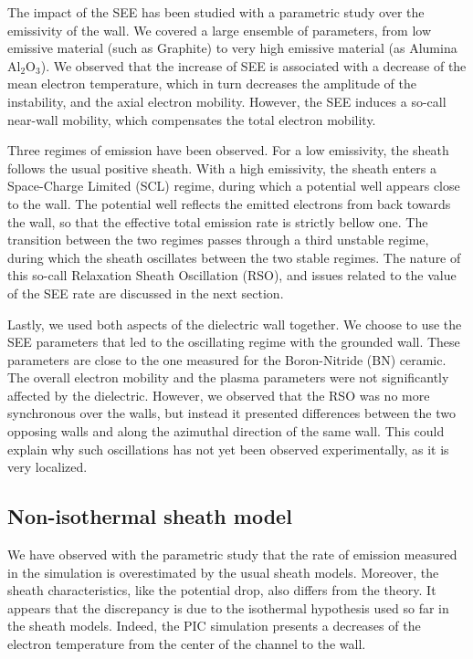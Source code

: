 The impact of the SEE has been studied with a parametric study over the emissivity of the wall.
We covered a large ensemble of parameters, from low emissive material (such as Graphite) to very high emissive material (as Alumina Al$_2$O$_3$).
We observed that the increase of SEE is associated with a decrease of the mean electron temperature, which in turn decreases the amplitude of the instability, and the axial electron mobility.
However, the SEE induces a so-call near-wall mobility, which compensates the total electron  mobility.

Three regimes of emission have been observed.
For a low emissivity, the sheath follows the usual positive sheath.
With a high emissivity, the sheath enters a Space-Charge Limited (SCL) regime, during which a potential well appears close to the wall.
The potential well reflects the emitted electrons from back towards the wall, so that the effective total emission rate is strictly bellow one.
The transition between the two regimes passes through a third unstable regime, during which the sheath oscillates between the two stable regimes.
The nature of this so-call Relaxation Sheath Oscillation (RSO), and issues related to the value of the SEE rate are discussed in the next section.

Lastly, we used both aspects of the dielectric wall together.
We choose to use the SEE parameters that led to the oscillating regime with the grounded wall.
These parameters are close to the one measured for the Boron-Nitride (BN) ceramic.
The overall electron mobility and the plasma parameters were not significantly affected by the dielectric.
However, we observed that the RSO was no more synchronous over the walls, but instead it presented differences between the two opposing walls and along the azimuthal direction of the same wall.
This could explain why such oscillations has not yet been observed experimentally, as it is very localized.

\subsection{Non-isothermal sheath model}

We have observed with the parametric study that the rate of emission measured in the simulation is overestimated by the usual sheath models.
Moreover, the sheath characteristics, like the potential drop, also differs from the theory.
It appears that the discrepancy is due to the isothermal hypothesis used so far in the sheath models.
Indeed, the PIC simulation presents a decreases of the electron temperature from the center of the channel to the wall.

